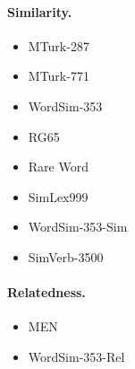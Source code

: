 \documentclass[11pt,a4paper]{article}
\begin{document}
{    \paragraph{Similarity.}
    
    \begin{itemize}
        \item MTurk-287~\cite{radinsky2011word}
        \item MTurk-771~\cite{halawi2012large}
        \item WordSim-353~\cite{finkelstein2001placing}
        \item RG65~\cite{rubenstein1965contextual}
        \item Rare Word~\cite{luong2013better}
        \item SimLex999~\cite{hill2015simlex}
        \item WordSim-353-Sim~\cite{agirre2009study}
        \item SimVerb-3500~\cite{Gerz2016emnlp}
    \end{itemize}
    
    \paragraph{Relatedness.}
    
    \begin{itemize}
        \item MEN~\cite{bruni2012distributional}
        \item WordSim-353-Rel~\cite{zesch2008using}
    \end{itemize}
    
%    
%    
%    

}
\end{document}
